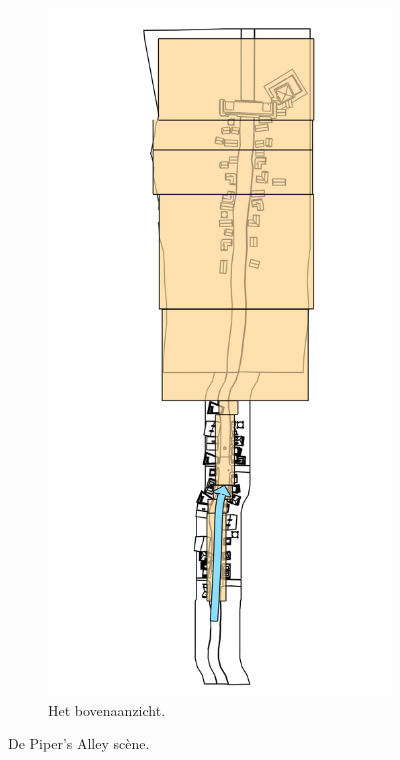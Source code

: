 \begin{figure}[t]
\begin{subfigure}[b]{0.3\textwidth}
    \centering\includegraphics[width=\textwidth]{./img/raw/test-suite-pipers-alley-map.png}
    \caption{Het bovenaanzicht.}
    \label{fig:test-suite-pipers-alley-map}
  \end{subfigure}
  \caption{De Piper's Alley sc\`ene.}
  \label{fig:test-suite-alley}
\end{figure}

